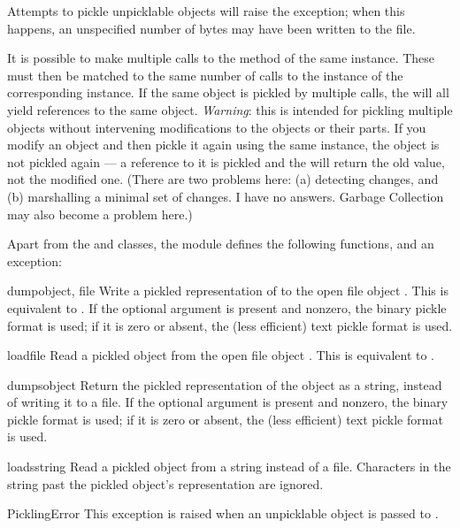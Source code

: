 Attempts to pickle unpicklable objects will raise the
 exception; when this happens, an unspecified
number of bytes may have been written to the file.

It is possible to make multiple calls to the  method of
the same  instance.  These must then be matched to the
same number of calls to the  instance of the
corresponding  instance.  If the same object is
pickled by multiple  calls, the  will all
yield references to the same object.  \emph{Warning}: this is intended
for pickling multiple objects without intervening modifications to the
objects or their parts.  If you modify an object and then pickle it
again using the same  instance, the object is not
pickled again --- a reference to it is pickled and the
 will return the old value, not the modified one.
(There are two problems here: (a) detecting changes, and (b)
marshalling a minimal set of changes.  I have no answers.  Garbage
Collection may also become a problem here.)

Apart from the  and  classes, the
module defines the following functions, and an exception:

\begin{funcdesc}{dump}{object, file}
Write a pickled representation of  to the open file object
.  This is equivalent to
.
If the optional  argument is present and nonzero, the binary
pickle format is used; if it is zero or absent, the (less efficient)
text pickle format is used.
\end{funcdesc}

\begin{funcdesc}{load}{file}
Read a pickled object from the open file object .  This is
equivalent to .
\end{funcdesc}

\begin{funcdesc}{dumps}{object}
Return the pickled representation of the object as a string, instead
of writing it to a file.  If the optional  argument is
present and nonzero, the binary pickle format is used; if it is zero
or absent, the (less efficient) text pickle format is used.
\end{funcdesc}

\begin{funcdesc}{loads}{string}
Read a pickled object from a string instead of a file.  Characters in
the string past the pickled object's representation are ignored.
\end{funcdesc}

\begin{excdesc}{PicklingError}
This exception is raised when an unpicklable object is passed to
.
\end{excdesc}


\begin{seealso}
\end{seealso}
